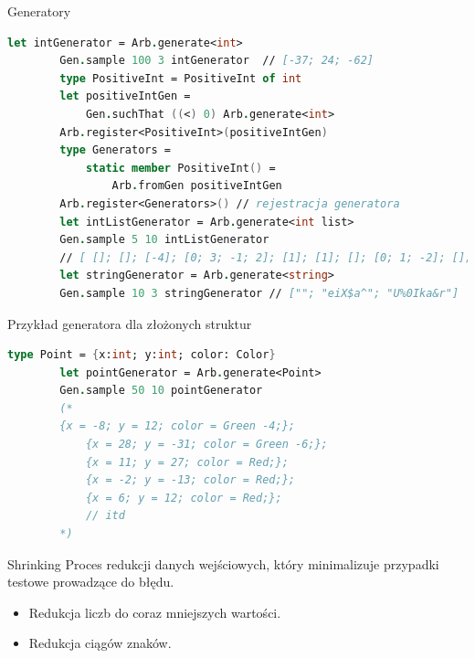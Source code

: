     \begin{frame}[fragile]{Generatory}
    \begin{lstlisting}[language=FSharp, xleftmargin=-40pt,xrightmargin=-10pt,numbers=none,basicstyle=\ttfamily\small]
        let intGenerator = Arb.generate<int>
        Gen.sample 100 3 intGenerator  // [-37; 24; -62]
        type PositiveInt = PositiveInt of int  
        let positiveIntGen =
            Gen.suchThat ((<) 0) Arb.generate<int>
        Arb.register<PositiveInt>(positiveIntGen)     
        type Generators =
            static member PositiveInt() =
                Arb.fromGen positiveIntGen
        Arb.register<Generators>() // rejestracja generatora
        let intListGenerator = Arb.generate<int list>
        Gen.sample 5 10 intListGenerator 
        // [ []; []; [-4]; [0; 3; -1; 2]; [1]; [1]; []; [0; 1; -2]; [];]  
        let stringGenerator = Arb.generate<string>
        Gen.sample 10 3 stringGenerator // [""; "eiX$a^"; "U%0Ika&r"]     
    \end{lstlisting}
    \end{frame}
    
    \begin{frame}[fragile]{Przykład generatora dla złożonych struktur}
    \begin{lstlisting}[language=FSharp, xleftmargin=-10pt,xrightmargin=-10pt,numbers=none]
        type Point = {x:int; y:int; color: Color}
        let pointGenerator = Arb.generate<Point>
        Gen.sample 50 10 pointGenerator
        (*
        {x = -8; y = 12; color = Green -4;};
            {x = 28; y = -31; color = Green -6;};
            {x = 11; y = 27; color = Red;};
            {x = -2; y = -13; color = Red;};
            {x = 6; y = 12; color = Red;};
            // itd
        *)
    \end{lstlisting}
    \end{frame}
    
    \begin{frame}[fragile]{Shrinking}
    Proces redukcji danych wejściowych, który minimalizuje przypadki testowe prowadzące do błędu.
    \begin{itemize}
        \item Redukcja liczb do coraz mniejszych wartości.
        \item Redukcja ciągów znaków.
    \end{itemize}
    \end{frame}
    
